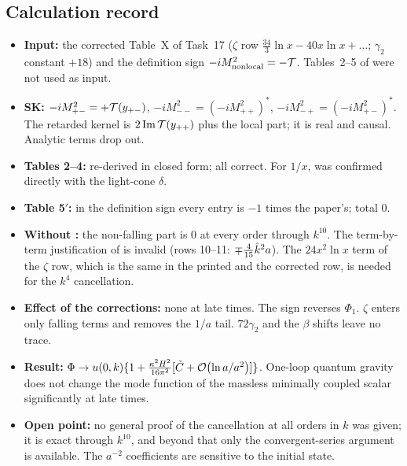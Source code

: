 \subsection{Calculation record}
\label{sec:t18-record}
\begin{itemize}[leftmargin=14pt]
\item \textbf{Input:} the corrected Table~X of Task~17 ($\zeta$ row $\tfrac{34}3\ln x-40x\ln x+\dots$; $\gamma_2$ constant $+18$) and the definition sign $-iM^2_{\rm nonlocal}=-\mathcal{T}$.
Tables~2--5 of \PII{} were not used as input.
\item \textbf{SK:} $-iM^2_{+-}=+\mathcal{T}(y_{+-})$, $-iM^2_{--}=(-iM^2_{++})^*$, $-iM^2_{-+}=(-iM^2_{+-})^*$. The retarded kernel is $2\,\mathrm{Im}\,\mathcal{T}(y_{++})$ plus the local part; it is real and causal.
Analytic terms drop out.
\item \textbf{Tables 2--4:} re-derived in closed form; all correct. For $1/x$,  was confirmed directly with the light-cone $\delta$.
\item \textbf{Table 5$'$:} in the definition sign every entry is $-1$ times the paper's; total $0$.
\item \textbf{Without :} the non-falling part is $0$ at every order through $k^{10}$. The term-by-term justification of  is invalid (rows 10--11: $\mp\tfrac4{15}\hat k^2a$).
The $24x^2\ln x$ term of the $\zeta$ row, which is the same in the printed and the corrected row, is needed for the $k^4$ cancellation.
\item \textbf{Effect of the corrections:} none at late times. The sign reverses $\Phi_1$. $\zeta$ enters only falling terms and removes the $1/a$ tail. $72\gamma_2$ and the $\beta$ shifts leave no trace.
\item \textbf{Result:} $\Phi\to u(0,k)\{1+\frac{\kappa^2H^2}{16\pi^2}[\tilde C+\mathcal{O}\!\left(\ln a/a^2\right)]\}$. One-loop quantum gravity does not change the mode function of the massless minimally coupled scalar significantly at late times.
\item \textbf{Open point:} no general proof of the cancellation at all orders in $k$ was given; it is exact through $k^{10}$, and beyond that only the convergent-series argument is available. The $a^{-2}$ coefficients are sensitive to the initial state.
\end{itemize}
